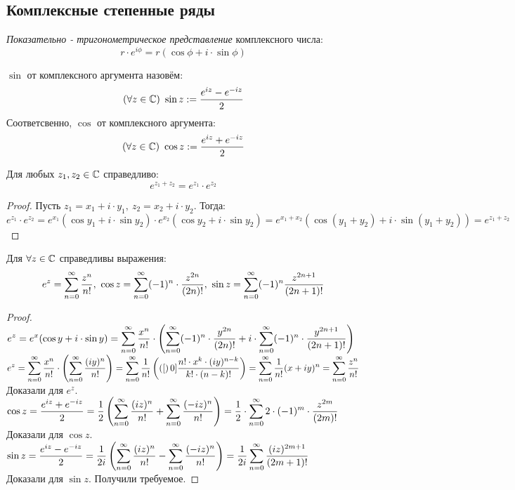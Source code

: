 \subsection{Комплексные степенные ряды}
\begin{definition}
	\textit{Показательно - тригонометрическое представление} комплексного числа:
	\[r\cdot e^{i\phi}=r(\cos\phi+i\cdot\sin\phi)\]
\end{definition}
\begin{definition}
	$\sin$ от комплексного аргумента назовём:
	\[(\forall z\in\mathbb C)\ \sin z:=\frac{e^{iz}-e^{-iz}}2\]
	Соответсвенно, $\cos$ от комплексного аргумента:
	\[(\fa z\in\C)\ \cos z:=\frac{e^{iz}+e^{-iz}}2\]
\end{definition}
\begin{lemma}
	Для любых $z_1,z_2\in\mathbb C$ справедливо:
	\[e^{z_1+z_2}=e^{z_1}\cdot e^{z_2}\]
\end{lemma}
\begin{proof}
	Пусть $z_1=x_1+i\cdot y_1,\ z_2=x_2+i\cdot y_2$. Тогда:
	\[e^{z_1}\cdot e^{z_2}=e^{x_1}(\cos y_1+i\cdot\sin y_2)\cdot e^{x_2}(\cos y_2+i\cdot\sin y_2)=e^{x_1+x_2}(\cos(y_1+y_2)+i\cdot\sin(y_1+y_2))=e^{z_1+z_2}\]
\end{proof}
\begin{theorem}\label{18_th2}
	Для $\forall z\in\mathbb C$ справедливы выражения:
	\[e^z=\ss[0]\frac{z^n}{n!},\ \cos z=\ss[0](-1)^n\cdot\frac{z^{2n}}{(2n)!},\ \sin z=\ss[0](-1)^n\frac{z^{2n+1}}{(2n+1)!}\]
\end{theorem}
\begin{proof}
	$\ds e^z=e^x(\cos y+i\cdot\sin y)=\ss[0]\frac{x^n}{n!}\cdot\l(\ss[0](-1)^n\cdot\frac{y^{2n}}{(2n)!}+i\cdot\ss[0](-1)^n\cdot\frac{y^{2n+1}}{(2n+1)!}\r)$\\
	$\ds e^z=\ss[0]\frac{x^n}{n!}\cdot\l(\ss[0]\frac{(iy)^n}{n!}\r)=\ss[0]\frac1{n!}\l(\ps[0]\frac{n!\cdot x^k\cdot(iy)^{n-k}}{k!\cdot(n-k)!}\r)=\ss[0]\frac1{n!}(x+iy)^n=\ss[0]\frac{z^n}{n!}$\\
	Доказали для $e^z$.\\
	$\ds\cos z=\frac{e^{iz}+e^{-iz}}2=\frac12\l(\ss[0]\frac{(iz)^n}{n!}+\ss[0]\frac{(-iz)^n}{n!}\r)=\frac12\cdot\ss[0]2\cdot(-1)^m\cdot\frac{z^{2m}}{(2m)!}$\\
	Доказали для $\cos z$.\\
	$\ds\sin z=\frac{e^{iz}-e^{-iz}}2=\frac1{2i}\l(\ss[0]\frac{(iz)^n}{n!}-\ss[0]\frac{(-iz)^n}{n!}\r)=\frac1{2i}\ss[0]\frac{(iz)^{2m+1}}{(2m+1)!}$\\
	Доказали для $\sin z$. Получили требуемое.
\end{proof}